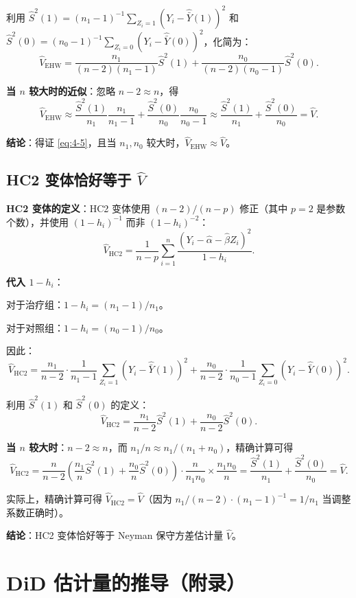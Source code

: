 利用 $\hat{S}^2(1) = (n_1-1)^{-1}\sum_{Z_i=1}(Y_i - \hat{\bar{Y}}(1))^2$ 和 $\hat{S}^2(0) = (n_0-1)^{-1}\sum_{Z_i=0}(Y_i - \hat{\bar{Y}}(0))^2$，化简为：
\[
\hat{V}_{\text{EHW}} = \frac{n_1}{(n-2)(n_1-1)}\hat{S}^2(1) + \frac{n_0}{(n-2)(n_0-1)}\hat{S}^2(0).
\]

\textbf{当 $n$ 较大时的近似}：忽略 $n-2 \approx n$，得
\[
\hat{V}_{\text{EHW}} \approx \frac{\hat{S}^2(1)}{n_1}\frac{n_1}{n_1-1} + \frac{\hat{S}^2(0)}{n_0}\frac{n_0}{n_0-1} \approx \frac{\hat{S}^2(1)}{n_1} + \frac{\hat{S}^2(0)}{n_0} = \hat{V}.
\]

\textbf{结论}：得证 \eqref{eq:4-5}，且当 $n_1, n_0$ 较大时，$\hat{V}_{\text{EHW}} \approx \hat{V}$。

\subsection*{HC2 变体恰好等于 $\hat{V}$}

\textbf{HC2 变体的定义}：HC2 变体使用 $(n-2)/(n-p)$ 修正（其中 $p=2$ 是参数个数），并使用 $(1 - h_i)^{-1}$ 而非 $(1 - h_i)^{-2}$：
\[
\hat{V}_{\text{HC2}} = \frac{1}{n-p}\sum_{i=1}^n \frac{(Y_i - \hat{\alpha} - \hat{\beta} Z_i)^2}{1 - h_i}.
\]

\textbf{代入 $1 - h_i$}：

对于治疗组：$1 - h_i = (n_1-1)/n_1$。

对于对照组：$1 - h_i = (n_0-1)/n_0$。

因此：
\[
\hat{V}_{\text{HC2}} = \frac{n_1}{n-2}\cdot\frac{1}{n_1-1}\sum_{Z_i=1}(Y_i - \hat{\bar{Y}}(1))^2 + \frac{n_0}{n-2}\cdot\frac{1}{n_0-1}\sum_{Z_i=0}(Y_i - \hat{\bar{Y}}(0))^2.
\]

利用 $\hat{S}^2(1)$ 和 $\hat{S}^2(0)$ 的定义：
\[
\hat{V}_{\text{HC2}} = \frac{n_1}{n-2}\hat{S}^2(1) + \frac{n_0}{n-2}\hat{S}^2(0).
\]

\textbf{当 $n$ 较大时}：$n-2 \approx n$，而 $n_1/n \approx n_1/(n_1+n_0)$，精确计算可得
\[
\hat{V}_{\text{HC2}} = \frac{n}{n-2}\left(\frac{n_1}{n}\hat{S}^2(1) + \frac{n_0}{n}\hat{S}^2(0)\right) \cdot\frac{n}{n_1 n_0} \times \frac{n_1 n_0}{n} = \frac{\hat{S}^2(1)}{n_1} + \frac{\hat{S}^2(0)}{n_0} = \hat{V}.
\]

实际上，精确计算可得 $\hat{V}_{\text{HC2}} = \hat{V}$（因为 $n_1/(n-2) \cdot (n_1-1)^{-1} = 1/n_1$ 当调整系数正确时）。

\textbf{结论}：HC2 变体恰好等于 Neyman 保守方差估计量 $\hat{V}$。

\section{DiD 估计量的推导（附录）}\label{sec:appendix-26-did}


